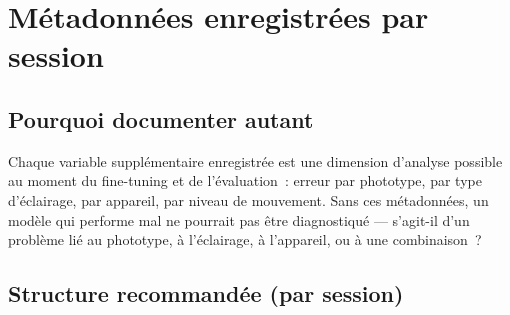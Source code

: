 \documentclass[11pt,a4paper]{article}
\begin{document}
\newpage
\section{M\'etadonn\'ees enregistr\'ees par session}

\subsection{Pourquoi documenter autant}

Chaque variable suppl\'ementaire enregistr\'ee est une dimension d'analyse
possible au moment du fine-tuning et de l'\'evaluation~: erreur par
phototype, par type d'\'eclairage, par appareil, par niveau de mouvement.
Sans ces m\'etadonn\'ees, un mod\`ele qui performe mal ne pourrait pas \^etre
diagnostiqu\'e --- s'agit-il d'un probl\`eme li\'e au phototype, \`a
l'\'eclairage, \`a l'appareil, ou \`a une combinaison~?

\subsection{Structure recommand\'ee (par session)}
\end{document}
